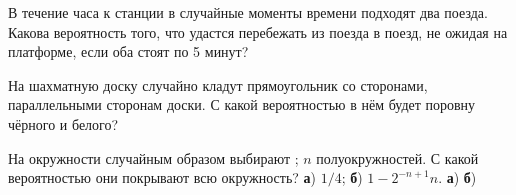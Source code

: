 \documentclass[a4paper,11pt]{article}
\begin{document}
В течение часа к станции в случайные моменты времени
подходят два поезда. Какова вероятность того, что удастся перебежать
из поезда в поезд, не ожидая на платформе, если оба стоят по 5 минут?














%












На шахматную доску случайно кладут прямоугольник со сторонами, параллельными сторонам доски.
С какой вероятностью в нём будет поровну чёрного и белого?















На окружности случайным образом выбирают ;  $n$ полуокружностей.
С какой вероятностью они покрывают всю окружность?
\textbf{а}) $1/4$; \textbf{б}) $1 - 2^{-n+1}n$.
\textbf{а})
\textbf{б})



\end{document}
